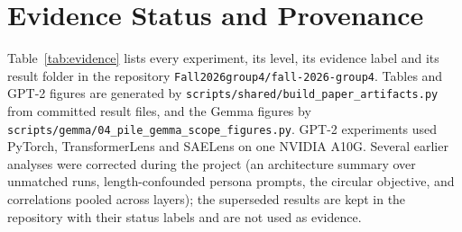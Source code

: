 \section{Evidence Status and Provenance}\label{app:provenance}

Table~\ref{tab:evidence} lists every experiment, its level, its evidence label and its result folder in the repository
\texttt{Fall2026group4/\allowbreak{}fall-2026-group4}. Tables and GPT-2 figures are generated by
\texttt{scripts/\allowbreak{}shared/\allowbreak{}build\_paper\_artifacts.py} from committed result files, and the Gemma figures by
\texttt{scripts/\allowbreak{}gemma/\allowbreak{}04\_pile\_gemma\_scope\_figures.py}. GPT-2 experiments used PyTorch, TransformerLens
\citep{transformerlens2022} and SAELens \citep{saelens2024} on one NVIDIA A10G. Several earlier analyses were corrected
during the project (an architecture summary over unmatched runs, length-confounded persona prompts, the circular
objective, and correlations pooled across layers); the superseded results are kept in the repository with their status
labels and are not used as evidence.


